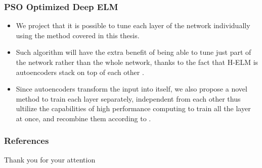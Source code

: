 \documentclass{beamer}
\begin{document}
\begin{frame}
{\begin{figure}[h]
\begin{center}
        \end{center}       
    \end{figure}}
\end{frame}
\begin{frame}
    \frametitle{PSO Optimized Deep ELM}
    \begin{itemize}
        \item <1-> We project that it is possible to tune each layer of the network individually using the method covered in this thesis.
        \item <2-> Such algorithm will have the extra benefit of being able to tune just part of the network rather than the whole network, thanks to the fact that H-ELM is autoencoders stack on top of each other \cite{tang_extreme_2016}.
        \item <3> Since autoencoders transform the input into itself, we also propose a novel method to train each layer separately, independent from each other thus ultilize the capabilities of high performance computing to train all the layer at once, and recombine them according to \cite{cao_building_2016}.
    \end{itemize}
\end{frame}

\begin{frame}
\frametitle{References}


\end{frame}


\begin{frame}
\Huge{\centerline{Thank you for your attention}}
\end{frame}

\end{document}

